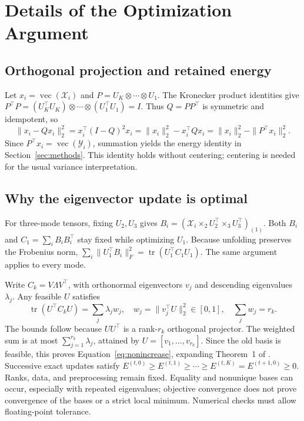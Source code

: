 \section{Details of the Optimization Argument}
\label{app:proof}
\subsection{Orthogonal projection and retained energy}
Let $x_i=\operatorname{vec}(\mathcal X_i)$ and
$P=U_K\otimes\cdots\otimes U_1$. The Kronecker product identities give
$P^\top P=(U_K^\top U_K)\otimes\cdots\otimes(U_1^\top U_1)=I$.
Thus $Q=PP^\top$ is symmetric and idempotent, so
\begin{equation}
\|x_i-Qx_i\|_2^2
=x_i^\top(I-Q)^2x_i
=\|x_i\|_2^2-x_i^\top Qx_i
=\|x_i\|_2^2-\|P^\top x_i\|_2^2.
\end{equation}
Since $P^\top x_i=\operatorname{vec}(\mathcal Y_i)$, summation yields the energy
identity in Section~\ref{sec:methods}. This identity holds without centering;
centering is needed for the usual variance interpretation.

\subsection{Why the eigenvector update is optimal}
For three-mode tensors, fixing $U_2,U_3$ gives
$B_i=(\mathcal X_i\times_2U_2^\top\times_3U_3^\top)_{(1)}$.
Both $B_i$ and $C_1=\sum_iB_iB_i^\top$ stay fixed while optimizing $U_1$.
Because unfolding preserves the Frobenius norm,
$\sum_i\|U_1^\top B_i\|_F^2=\operatorname{tr}(U_1^\top C_1U_1)$.
The same argument applies to every mode.

Write $C_k=V\Lambda V^\top$, with orthonormal eigenvectors $v_j$ and descending
eigenvalues $\lambda_j$. Any feasible $U$ satisfies
\begin{equation}
\operatorname{tr}(U^\top C_kU)=\sum_j\lambda_jw_j,
\quad w_j=\|v_j^\top U\|_2^2\in[0,1],
\quad\sum_jw_j=r_k.
\end{equation}
The bounds follow because $UU^\top$ is a rank-$r_k$ orthogonal projector.
The weighted sum is at most $\sum_{j=1}^{r_k}\lambda_j$, attained by
$U=[v_1,\ldots,v_{r_k}]$. Since the old basis is feasible, this proves
Equation~\eqref{eq:nonincrease}, expanding Theorem~1 of \citet{xu2008csa}.
Successive exact updates satisfy
$E^{(t,0)}\geq E^{(t,1)}\geq\cdots\geq E^{(t,K)}=E^{(t+1,0)}\geq0$.
Ranks, data, and preprocessing remain fixed. Equality and nonunique bases can
occur, especially with repeated eigenvalues; objective convergence does not
prove convergence of the bases or a strict local minimum. Numerical checks
must allow floating-point tolerance.

